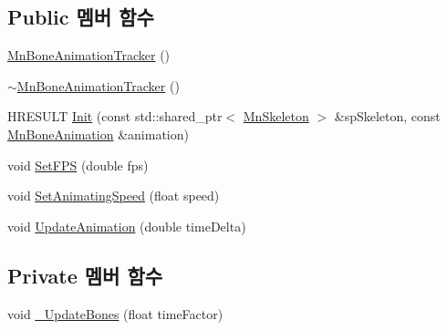 \subsection*{Public 멤버 함수}
\begin{DoxyCompactItemize}
\item 
\hyperlink{class_m_n_l_1_1_mn_bone_animation_tracker_a54ca35d4c15067230ebcf72064abc319}{Mn\+Bone\+Animation\+Tracker} ()
\item 
\hyperlink{class_m_n_l_1_1_mn_bone_animation_tracker_a90ea134da8fbc89ed8f5d4b5b9e562fb}{$\sim$\+Mn\+Bone\+Animation\+Tracker} ()
\item 
H\+R\+E\+S\+U\+LT \hyperlink{class_m_n_l_1_1_mn_bone_animation_tracker_abe68ff29930c52db601b6158e5f03bf7}{Init} (const std\+::shared\+\_\+ptr$<$ \hyperlink{class_m_n_l_1_1_mn_skeleton}{Mn\+Skeleton} $>$ \&sp\+Skeleton, const \hyperlink{class_m_n_l_1_1_mn_bone_animation}{Mn\+Bone\+Animation} \&animation)
\item 
void \hyperlink{class_m_n_l_1_1_mn_bone_animation_tracker_a7e3a689e2850bc4cffec74444efd6129}{Set\+F\+PS} (double fps)
\item 
void \hyperlink{class_m_n_l_1_1_mn_bone_animation_tracker_a0bbded38ae7eb717880b49ed00b25f1f}{Set\+Animating\+Speed} (float speed)
\item 
void \hyperlink{class_m_n_l_1_1_mn_bone_animation_tracker_aa411090b4490d4c0422865ab8b563ddf}{Update\+Animation} (double time\+Delta)
\end{DoxyCompactItemize}
\subsection*{Private 멤버 함수}
\begin{DoxyCompactItemize}
\item 
void \hyperlink{class_m_n_l_1_1_mn_bone_animation_tracker_abb7e0010c3717fe7b6f54a6665b31bbc}{\+\_\+\+Update\+Bones} (float time\+Factor)
\end{DoxyCompactItemize}
